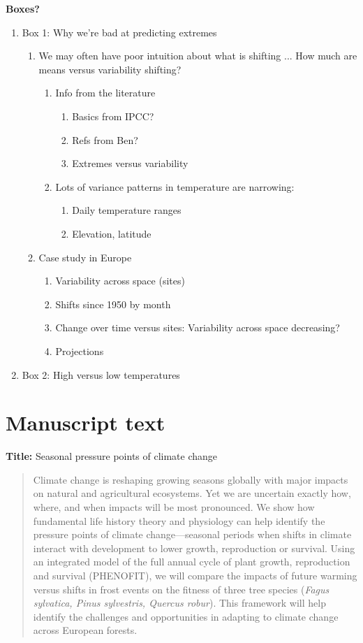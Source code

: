 \documentclass[11pt,letter]{article}
\begin{document}
{\bf Boxes?}
\begin{enumerate}
\item Box 1: Why we're bad at predicting extremes
\begin{enumerate}
\item We may often have poor intuition about what is shifting ... How much are means versus variability shifting? %
\begin{enumerate}
\item Info from the literature
\begin{enumerate}
\item Basics from IPCC?
\item Refs from Ben?
\item Extremes versus variability
\end{enumerate}
\item Lots of variance patterns in temperature are narrowing: 
\begin{enumerate}
\item Daily temperature ranges
\item Elevation, latitude
\end{enumerate}
\end{enumerate}
\item Case study in Europe
\begin{enumerate}
\item Variability across space (sites)
\item Shifts since 1950 by month 
\item Change over time versus sites: Variability across space decreasing?
\item Projections
\end{enumerate}
\end{enumerate}
\item Box 2: High versus low temperatures
\end{enumerate}




\newpage
\section{Manuscript text} 

{\bf Title:} Seasonal pressure points of climate change

\begin{abstract}
Climate change is reshaping growing seasons globally with major impacts on natural and agricultural ecosystems. Yet we are uncertain exactly how, where, and when impacts will be most pronounced. We show how fundamental life history theory and physiology can help identify the pressure points of climate change---seasonal periods when shifts in climate interact with development to lower growth, reproduction or survival. Using an integrated model of the full annual cycle of plant growth, reproduction and survival (PHENOFIT), we will compare the impacts of future warming versus shifts in frost events on the fitness of three tree species (\emph{Fagus sylvatica, Pinus sylvestris, Quercus robur}). This framework will help identify the challenges and opportunities in adapting to climate change across European forests. 
\end{abstract}
\end{document}
